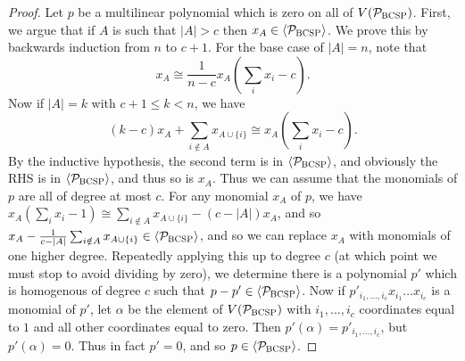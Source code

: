 \begin{proof}
Let $p$ be a multilinear polynomial which is zero on all of $V(\mathcal P_{\textsc{BCSP}})$. First, we argue that if $A$ is such that $|A| > c$ then $x_A \in \langle \mathcal P_{\textsc{BCSP}} \rangle$. We prove this by backwards induction from $n$ to $c+1$. For the base case of $|A| = n$, note that 
\[x_A \cong \frac{1}{n-c} x_A\left(\sum_i x_i - c\right).\]
Now if $|A| = k$ with $c+1 \leq k < n$, we have
\[\left(k-c\right)x_A + \sum_{i \notin A} x_{A \cup \{i\}} \cong x_A\left(\sum_i x_i - c\right).\]
By the inductive hypothesis, the second term is in $\langle \mathcal P_{\textsc{BCSP}} \rangle$, and obviously the RHS is in $\langle \mathcal P_{\textsc{BCSP}} \rangle$, and thus so is $x_A$. Thus we can assume that the monomials of $p$ are all of degree at most $c$. For any monomial $x_A$ of $p$, we have $x_A(\sum_i x_i - 1) \cong \sum_{i \notin A} x_{A \cup \{i\}} - (c-|A|)x_A$, and so $x_A - \frac{1}{c - |A|}\sum_{i \notin A} x_{A \cup \{i\}} \in \langle \mathcal P_{\textsc{BCSP}} \rangle$, and so we can replace $x_A$ with monomials of one higher degree. Repeatedly applying this up to degree $c$ (at which point we must stop to avoid dividing by zero), we determine there is a polynomial $p'$ which is homogenous of degree $c$ such that $p - p' \in \langle \mathcal P_{\textsc{BCSP}} \rangle$. Now if $p'_{i_1,\dots,i_c}x_{i_1}\dots x_{i_c}$ is a monomial of $p'$, let $\alpha$ be the element of $V(\mathcal P_{\textsc{BCSP}})$ with $i_1,\dots,i_c$ coordinates equal to $1$ and all other coordinates equal to zero. Then $p'(\alpha) = p'_{i_1,\dots,i_c}$, but $p'(\alpha) = 0$. Thus in fact $p' = 0$, and so $p \in \langle \mathcal P_{\textsc{BCSP}} \rangle$.
\end{proof}

